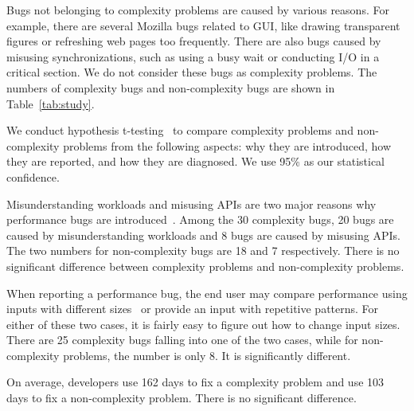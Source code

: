 Bugs not belonging to complexity problems are caused by various reasons.
For example, there are several Mozilla bugs related to GUI, 
like drawing transparent figures or refreshing web pages too frequently. 
There are also bugs caused by misusing synchronizations, 
such as using a busy wait or conducting I/O in a critical section. 
We do not consider these bugs as complexity problems.
The numbers of complexity bugs and non-complexity bugs 
are shown in Table~\ref{tab:study}.


We conduct hypothesis t-testing~\cite{ttest} 
to compare complexity problems and non-complexity 
problems from the following aspects: why they are introduced, 
how they are reported, and how they are diagnosed. 
We use 95\% as our statistical confidence. 

Misunderstanding workloads and misusing APIs
are two major reasons why performance bugs are introduced~\cite{PerfBug}. 
Among the 30 complexity bugs, 20 bugs are caused 
by misunderstanding workloads
and 8 bugs are caused by misusing APIs. 
The two numbers for non-complexity bugs are 18 and 7 respectively. 
There is no significant difference between complexity 
problems and non-complexity problems. 


When reporting a performance bug, the end user may 
compare performance using inputs with different sizes~\cite{SongOOPSLA2014}  
or provide an input with repetitive patterns. 
For either of these two cases, 
it is fairly easy to figure out how to change input sizes. 
There are 25 complexity bugs falling into one of the two cases, 
while for non-complexity problems, the number is only 8.
It is significantly different. 

On average, developers use 162 days to fix a 
complexity problem and use 103 days to fix a non-complexity problem. 
There is no significant difference. 
